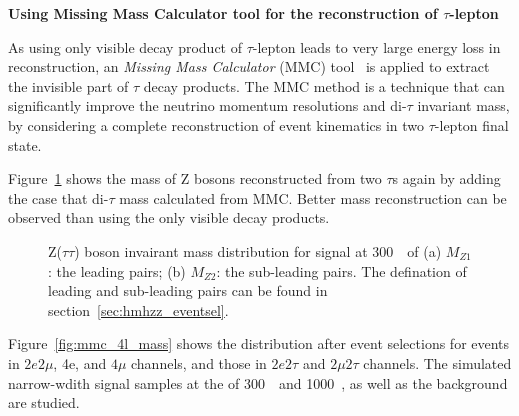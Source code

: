 \textbf{Using Missing Mass Calculator tool for the reconstruction of $\tau$-lepton}

As using only visible decay product of $\tau$-lepton leads to very large energy loss in reconstruction, 
an \textit{Missing Mass Calculator} (MMC) tool~\cite{elagin2011new} is applied to extract the invisible part of $\tau$ decay products.
The MMC method is a technique that can significantly improve the neutrino momentum resolutions and di-$\tau$ invariant mass,
by considering a complete reconstruction of event kinematics in two $\tau$-lepton final state.

Figure~\ref{fig:mmc_Ztt_mass} shows the mass of Z bosons reconstructed from two $\tau$s again by adding the case that di-$\tau$ mass calculated from MMC.
Better mass reconstruction can be observed than using the only visible decay products.
\begin{figure}[!htbp]
\centering
{}
\caption{
Z(\rightarrow $\tau\tau$) boson invairant mass distribution for signal at 300~\gev~of
(a) $M_{Z1}$: the leading pairs;
(b) $M_{Z2}$: the sub-leading pairs.
The defination of leading and sub-leading pairs can be found in section~\ref{sec:hmhzz_eventsel}.
}
\label{fig:mmc_Ztt_mass}
\end{figure}

Figure~\ref{fig:mmc_4l_mass} shows the \mfl distribution after event selections for events in $2e2\mu$, 4e, and $4\mu$ channels, 
and those in $2e2\tau$ and $2\mu2\tau$ channels. 
The simulated narrow-wdith signal samples at the \mH of 300~\gev~and 1000~\gev, as well as the \qqZZ background are studied.

